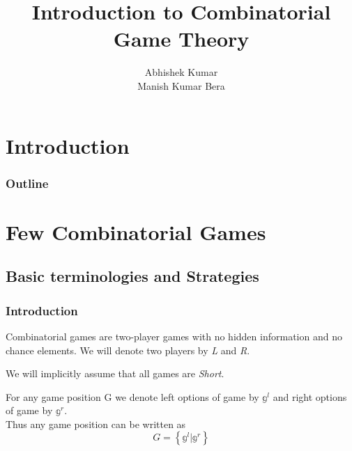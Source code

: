 \documentclass[12pt]{beamer}
\title{Introduction to Combinatorial Game Theory}
\author{Abhishek Kumar\\ Manish Kumar Bera}
\institute{IITK}
\begin{document}
\section{Introduction}
\begin{frame}
\titlepage
\end{frame}

\begin{frame}

\frametitle{Outline}

\tableofcontents

\end{frame}

\section{Few Combinatorial Games}

\subsection{Basic terminologies and Strategies}

\begin{frame}

\frametitle{Introduction}

\begin{definition}
Combinatorial games are two-player games with no hidden information and no chance elements. We will denote two players by \textit{L} and \textit{R}.
\end{definition}

\pause

We will implicitly assume that all games are \textit{Short}.
\pause

\begin{definition}
For any game position G we denote left options of game by $ \mathbb{g^\textit{l}}$ and right options of game by $ \mathbb{g^\textit{r}}$.\\
Thus any game position can be written as
$$G = \left\{\mathbb{g^\textit{l}} | \mathbb{g^\textit{r}} \right\}$$
\end{definition}
\end{frame}
\end{document}
